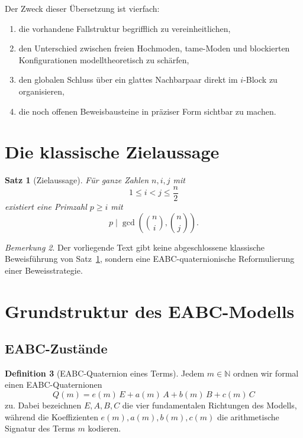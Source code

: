 \documentclass[12pt,a4paper]{article}
\theoremstyle{plain}
\newtheorem{theorem}{Satz}[section]
\theoremstyle{definition}
\newtheorem{definition}[theorem]{Definition}
\theoremstyle{remark}
\newtheorem{remark}[theorem]{Bemerkung}
\begin{document}
	Der Zweck dieser Übersetzung ist vierfach:
	\begin{enumerate}[label=\arabic*)]
		\item die vorhandene Fallstruktur begrifflich zu vereinheitlichen,
		\item den Unterschied zwischen freien Hochmoden, tame-Moden und blockierten Konfigurationen modelltheoretisch zu schärfen,
		\item den globalen Schluss über ein glattes Nachbarpaar direkt im \(i\)-Block zu organisieren,
		\item die noch offenen Beweisbausteine in präziser Form sichtbar zu machen.
	\end{enumerate}
	
	\section{Die klassische Zielaussage}
	
	\begin{theorem}[Zielaussage]
		\label{thm:zielaussage}
		Für ganze Zahlen \(n,i,j\) mit
		\[
		1\le i<j\le \frac{n}{2}
		\]
		existiert eine Primzahl \(p\ge i\) mit
		\[
		p \mid \gcd\!\left(\binom{n}{i},\binom{n}{j}\right).
		\]
	\end{theorem}
	
	\begin{remark}
		Der vorliegende Text gibt keine abgeschlossene klassische Beweisführung von Satz~\ref{thm:zielaussage}, sondern eine EABC-quaternionische Reformulierung einer Beweisstrategie.
	\end{remark}
	
	\section{Grundstruktur des EABC-Modells}
	
	\subsection{EABC-Zustände}
	
	\begin{definition}[EABC-Quaternion eines Terms]
		Jedem \(m\in\mathbb N\) ordnen wir formal einen EABC-Quaternionen
		\[
		Q(m)=e(m)\,E+a(m)\,A+b(m)\,B+c(m)\,C
		\]
		zu. Dabei bezeichnen \(E,A,B,C\) die vier fundamentalen Richtungen des Modells, während die Koeffizienten \(e(m),a(m),b(m),c(m)\) die arithmetische Signatur des Terms \(m\) kodieren.
	\end{definition}
	
\end{document}
